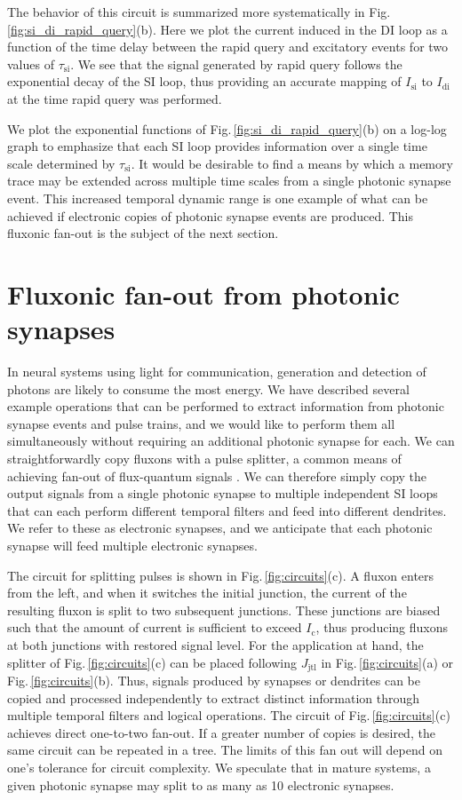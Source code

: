 \documentclass[twocolumn]{article}
\begin{document}
The behavior of this circuit is summarized more systematically in Fig.\,\ref{fig:si_di_rapid_query}(b). Here we plot the current induced in the DI loop as a function of the time delay between the rapid query and excitatory events for two values of $\tau_{\mathrm{si}}$. We see that the signal generated by rapid query follows the exponential decay of the SI loop, thus providing an accurate mapping of $I_{\mathrm{si}}$ to $I_{\mathrm{di}}$ at the time rapid query was performed. 

We plot the exponential functions of Fig.\,\ref{fig:si_di_rapid_query}(b) on a log-log graph to emphasize that each SI loop provides information over a single time scale determined by $\tau_{\mathrm{si}}$. It would be desirable to find a means by which a memory trace may be extended across multiple time scales from a single photonic synapse event. This increased temporal dynamic range is one example of what can be achieved if electronic copies of photonic synapse events are produced. This fluxonic fan-out is the subject of the next section.

\section{\label{sec:fluxonic_fanout}Fluxonic fan-out from photonic synapses}
In neural systems using light for communication, generation and detection of photons are likely to consume the most energy. We have described several example operations that can be performed to extract information from photonic synapse events and pulse trains, and we would like to perform them all simultaneously without requiring an additional photonic synapse for each. We can straightforwardly copy fluxons with a pulse splitter, a common means of achieving fan-out of flux-quantum signals \cite{lise1991}. We can therefore simply copy the output signals from a single photonic synapse to multiple independent SI loops that can each perform different temporal filters and feed into different dendrites. We refer to these as electronic synapses, and we anticipate that each photonic synapse will feed multiple electronic synapses.

The circuit for splitting pulses is shown in Fig.\,\ref{fig:circuits}(c). A fluxon enters from the left, and when it switches the initial junction, the current of the resulting fluxon is split to two subsequent junctions. These junctions are biased such that the amount of current is sufficient to exceed $I_{\mathrm{c}}$, thus producing fluxons at both junctions with restored signal level. For the application at hand, the splitter of Fig.\,\ref{fig:circuits}(c) can be placed following $J_{\mathrm{jtl}}$ in Fig.\,\ref{fig:circuits}(a) or Fig.\,\ref{fig:circuits}(b). Thus, signals produced by synapses or dendrites can be copied and processed independently to extract distinct information through multiple temporal filters and logical operations. The circuit of Fig.\,\ref{fig:circuits}(c) achieves direct one-to-two fan-out. If a greater number of copies is desired, the same circuit can be repeated in a tree. The limits of this fan out will depend on one's tolerance for circuit complexity. We speculate that in mature systems, a given photonic synapse may split to as many as 10 electronic synapses. 
\end{document}

